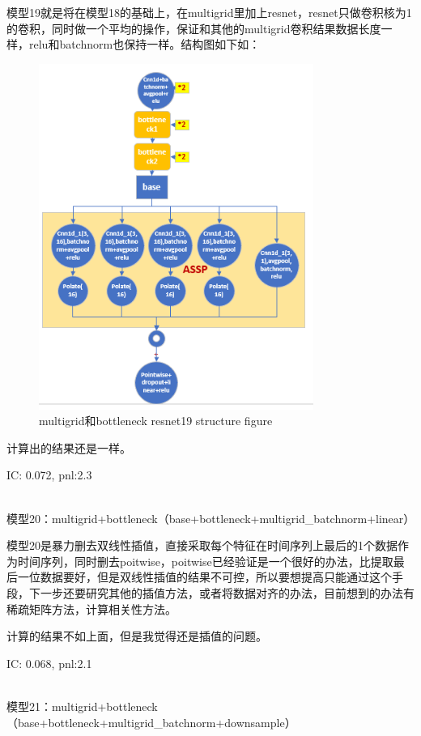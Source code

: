\documentclass[11pt]{ctexart}
\begin{document}
模型19就是将在模型18的基础上，在multigrid里加上resnet，resnet只做卷积核为1的卷积，同时做一个平均的操作，保证和其他的multigrid卷积结果数据长度一样，relu和batchnorm也保持一样。结构图如下如：
\begin{figure}[H]
\begin{center}
\includegraphics[width=0.8\textwidth]{str12.PNG}
\end{center}
\caption{multigrid和bottleneck resnet19 structure figure}
\label{FIG.13}
\end{figure}
计算出的结果还是一样。

{\kaishu \small IC: 0.072, pnl:2.3}

~\\
模型20：multigrid+bottleneck（base+bottleneck+multigrid\_batchnorm+linear）

模型20是暴力删去双线性插值，直接采取每个特征在时间序列上最后的1个数据作为时间序列，同时删去poitwise，poitwise已经验证是一个很好的办法，比提取最后一位数据要好，但是双线性插值的结果不可控，所以要想提高只能通过这个手段，下一步还要研究其他的插值方法，或者将数据对齐的办法，目前想到的办法有稀疏矩阵方法，计算相关性方法。

计算的结果不如上面，但是我觉得还是插值的问题。

{\kaishu \small IC: 0.068, pnl:2.1}

~\\
模型21：multigrid+bottleneck（base+bottleneck+multigrid\_batchnorm+downsample）
\end{document}
